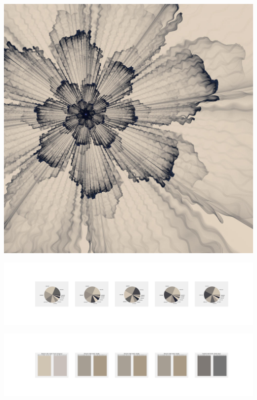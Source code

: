 \documentclass[11pt]{article}
\begin{document}
\begin{landscape}
    \begin{center}
    \includegraphics[width=\textwidth]{./nbimg/file (165).jpg}
    \end{center}

    \begin{center}
    \includegraphics[width=250mm]{./nbimg/pie-73.jpg}
    \end{center}

    \begin{center}
    \includegraphics[width=250mm]{./nbimg/peak-73.jpg}
    \end{center}
    


\end{landscape}
\end{document}
